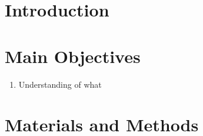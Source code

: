\documentclass[a0,portrait]{a0poster}
\begin{document}
\begin{multicols}{2} %


	\color{ku} %

	\begin{abstract}

	\end{abstract}


	\color{DarkRed} %

	\section*{Introduction}



	\color{DarkSlateGray} %

	\section*{Main Objectives}

	\begin{enumerate}
		\item Understanding of what 
	\end{enumerate}


	\section*{Materials and Methods}



\end{multicols}
\end{document}
